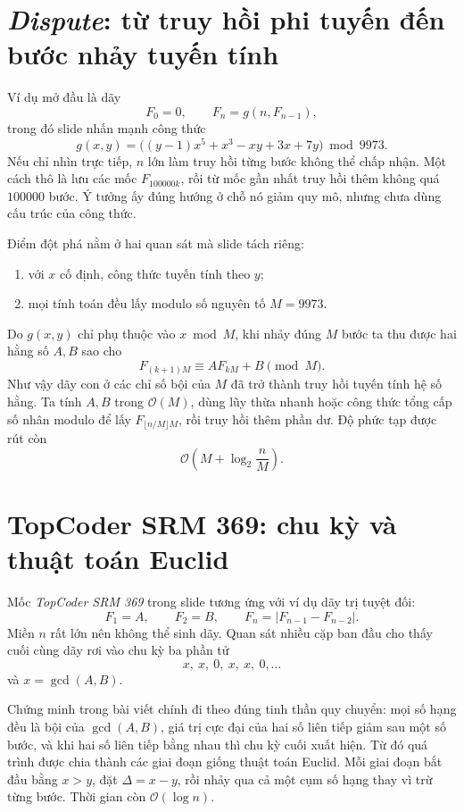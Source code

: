 \documentclass[11pt]{article}
\newcommand{\Oh}{\mathcal{O}}
\begin{document}
\section{\textit{Dispute}: từ truy hồi phi tuyến đến bước nhảy tuyến tính}

Ví dụ mở đầu là dãy
\[
  F_0=0,\qquad F_n=g(n,F_{n-1}),
\]
trong đó slide nhấn mạnh công thức
\[
  g(x,y)=\bigl((y-1)x^5+x^3-xy+3x+7y\bigr)\bmod 9973.
\]
Nếu chỉ nhìn trực tiếp, \(n\) lớn làm truy hồi từng bước không thể chấp nhận.
Một cách thô là lưu các mốc \(F_{100000k}\), rồi từ mốc gần nhất truy hồi
thêm không quá \(100000\) bước. Ý tưởng ấy đúng hướng ở chỗ nó giảm quy mô,
nhưng chưa dùng cấu trúc của công thức.

Điểm đột phá nằm ở hai quan sát mà slide tách riêng:
\begin{enumerate}
  \item với \(x\) cố định, công thức tuyến tính theo \(y\);
  \item mọi tính toán đều lấy modulo số nguyên tố \(M=9973\).
\end{enumerate}
Do \(g(x,y)\) chỉ phụ thuộc vào \(x\bmod M\), khi nhảy đúng \(M\) bước ta thu
được hai hằng số \(A,B\) sao cho
\[
  F_{(k+1)M}\equiv AF_{kM}+B\pmod M.
\]
Như vậy dãy con ở các chỉ số bội của \(M\) đã trở thành truy hồi tuyến tính
hệ số hằng. Ta tính \(A,B\) trong \(\Oh(M)\), dùng lũy thừa nhanh hoặc công
thức tổng cấp số nhân modulo để lấy \(F_{\lfloor n/M\rfloor M}\), rồi truy
hồi thêm phần dư. Độ phức tạp được rút còn
\[
  \Oh\!\left(M+\log_2\frac{n}{M}\right).
\]

\section{TopCoder SRM 369: chu kỳ và thuật toán Euclid}

Mốc \textit{TopCoder SRM 369} trong slide tương ứng với ví dụ dãy trị tuyệt
đối:
\[
  F_1=A,\qquad F_2=B,\qquad F_n=|F_{n-1}-F_{n-2}|.
\]
Miền \(n\) rất lớn nên không thể sinh dãy. Quan sát nhiều cặp ban đầu cho
thấy cuối cùng dãy rơi vào chu kỳ ba phần tử
\[
  x,\ x,\ 0,\ x,\ x,\ 0,\ldots
\]
và \(x=\gcd(A,B)\).

Chứng minh trong bài viết chính đi theo đúng tinh thần quy chuyển: mọi số hạng
đều là bội của \(\gcd(A,B)\), giá trị cực đại của hai số liên tiếp giảm sau
một số bước, và khi hai số liên tiếp bằng nhau thì chu kỳ cuối xuất hiện. Từ
đó quá trình được chia thành các giai đoạn giống thuật toán Euclid. Mỗi giai
đoạn bắt đầu bằng \(x>y\), đặt \(\Delta=x-y\), rồi nhảy qua cả một cụm số hạng
thay vì trừ từng bước. Thời gian còn \(\Oh(\log n)\).
\end{document}
